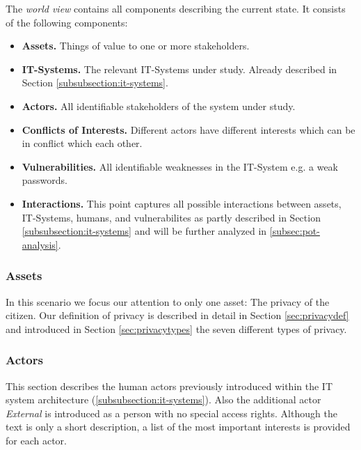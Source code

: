 \documentclass[runningheads,a4paper]{llncs}
\begin{document}
\label{subsec:world-analysis}

The \emph{world view} contains all components describing the current state.
It consists of the following components:
\begin{itemize}
	
	\item \textbf{Assets.} 
	Things of value to one or more stakeholders.
	
	\item \textbf{IT-Systems.}
	The relevant IT-Systems under study. Already described in Section \ref{subsubsection:it-systems}.
		
	\item \textbf{Actors.}
	All identifiable stakeholders of the system under study.
	
	\item \textbf{Conflicts of Interests.}
	Different actors have different interests which can be in conflict which each other.
	
	\item \textbf{Vulnerabilities.}
	All identifiable weaknesses in the IT-System e.g. a weak passwords.
	
	\item \textbf{Interactions.}
	This point captures all possible interactions between assets, IT-Systems, humans, and vulnerabilites as partly described in Section \ref{subsubsection:it-systems} and will be further analyzed in \ref{subsec:pot-analysis}.
	
\end{itemize}


\subsubsection{Assets}

In this scenario we focus our attention to only one asset: The privacy of the citizen.
Our definition of privacy is described in detail in Section \ref{sec:privacydef} and introduced in Section \ref{sec:privacytypes} the seven different types of privacy.


\subsubsection{Actors}
\label{subsubsection:humans}

This section describes the human actors previously introduced within the IT system architecture (\ref{subsubsection:it-systems}).
Also the additional actor \textit{External} is introduced as a person with no special access rights. Although the text is only a short description, a list of the most important interests is provided for each actor.
\end{document}
